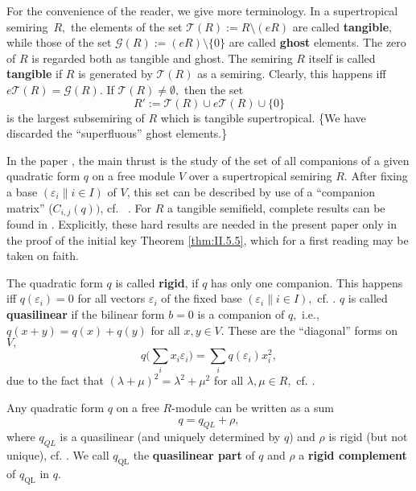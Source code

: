 \documentclass [12pt,a4paper,reqno]{amsart}
\begin{document}
For the convenience of the reader, we give more terminology. In a
supertropical semiring~$R,$ the elements of the set
${\mathcal T}(R):=R{\setminus}(eR)$ are called {\textbf{{tangible}}}, while those of
the set ${\mathcal G}(R):=(eR){\setminus}\{0\}$ are called
{\textbf{{ghost}}} elements. The zero of $R$ is regarded both as
tangible and ghost. The semiring $R$ itself is called {\textbf{{tangible}}} if $R$ is
generated by ${\mathcal T}(R)$ as a semiring. Clearly, this happens iff
$e{\mathcal T}(R)={\mathcal G}(R).$ If ${\mathcal T}(R)\ne\emptyset,$ then the set
$$R':={\mathcal T}(R)\cup e{\mathcal T}(R)\cup\{0\}$$
is the largest subsemiring of $R$ which is tangible supertropical.
\{We have discarded the ``superfluous'' ghost elements.\}

In the paper \cite{QF1}, the main thrust is the study of the set of
all companions of a given quadratic form $q$ on a free module $V$
over a supertropical semiring $R.$ After fixing a base
$(\varepsilon_i\|i\in I)$ of $V$, this set can be described by use
of a ``companion matrix'' ($C_{i,j}(q))$, cf.~ {\cite[~\S{{6}}]{QF1}}.  For
$R$ a tangible semifield, complete results can be found in
{\cite[~\S{{7}}]{QF1}}. Explicitly, these hard results are needed in the
present paper only in the proof of the initial key Theorem
\ref{thm:II.5.5}, which for a first reading may be taken on
faith.

The quadratic form $q$ is called {\textbf{{rigid}}}, if $q$ has only one
companion. This happens iff $q({\varepsilon}_i)=0$ for all vectors
${\varepsilon}_i$ of the fixed base $({\varepsilon}_i\|i\in I),$ cf.
{\cite[Theorem~{{3.5}}]{QF1}}. $q$ is called {\textbf{{quasilinear}}} if the
bilinear form $b=0$ is a companion of $q,$ i.e.,
$q(x+y)=q(x)+q(y)$ for all $x,y\in V.$ These are the ``diagonal''
forms on $V,$
\begin{equation}\label{eq:0.8}
q\bigg(\sum_ix_i{\varepsilon}_i\bigg)=\sum_i q({\varepsilon}_i)x_i^2,
\end{equation}
due to the fact that $({\lambda}+\mu)^2={\lambda}^2+\mu^2$ for all
${\lambda},\mu\in R,$ cf. {\cite[Proposition~{{0.5}}]{QF1}}.

Any quadratic form $q$ on a free $R$-module can be written as a
sum
\begin{equation}\label{eq:0.9}
q=q_{QL}+\rho,
\end{equation}
where $q_{QL}$ is a quasilinear (and uniquely determined by $q$)
and $\rho$ is rigid (but not unique), cf. {\cite[~\S{{4}}]{QF1}}. We call
$q_{\operatorname{QL}}$ the {\textbf{{quasilinear part}}} of $q$ and $\rho$ a
{\textbf{{rigid complement}}} of $q_{\operatorname{QL}}$ in $q.$
\end{document}
